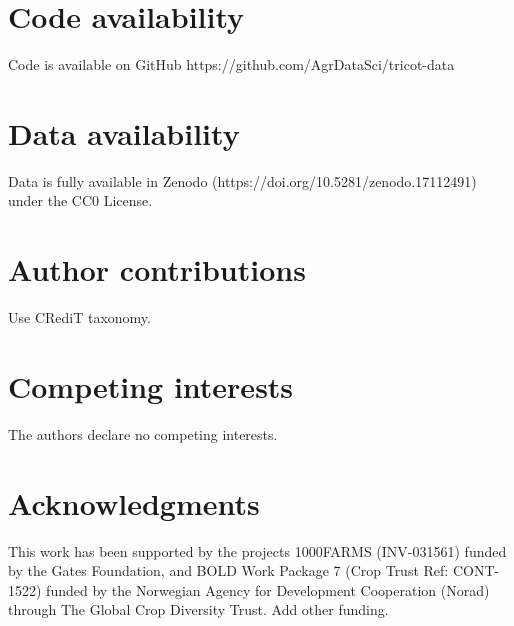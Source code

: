\documentclass[3p]{elsarticle} %
\begin{document}
\section{Code availability}\label{code-availability}

Code is available on GitHub https://github.com/AgrDataSci/tricot-data

\section{Data availability}\label{data-availability}

Data is fully available in Zenodo
(https://doi.org/10.5281/zenodo.17112491) under the CC0 License.

\section{Author contributions}\label{author-contributions}

Use CRediT taxonomy.

\section{Competing interests}\label{competing-interests}

The authors declare no competing interests.

\section{Acknowledgments}\label{acknowledgments}

This work has been supported by the projects 1000FARMS (INV-031561)
funded by the Gates Foundation, and BOLD Work Package 7 (Crop Trust Ref:
CONT-1522) funded by the Norwegian Agency for Development Cooperation
(Norad) through The Global Crop Diversity Trust. Add other funding.

\renewcommand\refname{References}

\end{document}
